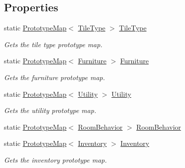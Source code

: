 \subsection*{Properties}
\begin{DoxyCompactItemize}
\item 
static \hyperlink{class_prototype_map}{Prototype\+Map}$<$ \hyperlink{class_tile_type}{Tile\+Type} $>$ \hyperlink{class_prototype_manager_a881412466a625880a9d352a44d88269a}{Tile\+Type}
\begin{DoxyCompactList}\small\item\em Gets the tile type prototype map. \end{DoxyCompactList}\item 
static \hyperlink{class_prototype_map}{Prototype\+Map}$<$ \hyperlink{class_furniture}{Furniture} $>$ \hyperlink{class_prototype_manager_ab60d7059dfa3996ba62c501f293d3afe}{Furniture}
\begin{DoxyCompactList}\small\item\em Gets the furniture prototype map. \end{DoxyCompactList}\item 
static \hyperlink{class_prototype_map}{Prototype\+Map}$<$ \hyperlink{class_utility}{Utility} $>$ \hyperlink{class_prototype_manager_a0628717a2cce375062112062d2200435}{Utility}
\begin{DoxyCompactList}\small\item\em Gets the utility prototype map. \end{DoxyCompactList}\item 
static \hyperlink{class_prototype_map}{Prototype\+Map}$<$ \hyperlink{class_project_porcupine_1_1_rooms_1_1_room_behavior}{Room\+Behavior} $>$ \hyperlink{class_prototype_manager_ae1612252bce28dd967a10a60dd9e8a37}{Room\+Behavior}
\item 
static \hyperlink{class_prototype_map}{Prototype\+Map}$<$ \hyperlink{class_inventory}{Inventory} $>$ \hyperlink{class_prototype_manager_aa1deb2ee3db4a2d9beb445882879d686}{Inventory}
\begin{DoxyCompactList}\small\item\em Gets the inventory prototype map. \end{DoxyCompactList}\item 

\end{DoxyCompactItemize}

